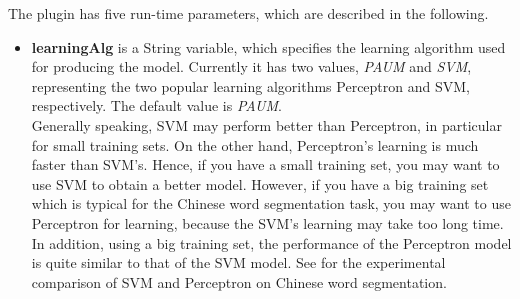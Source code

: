The plugin has five run-time parameters, which are described in the following.
\begin{itemize}
\item {\bf learningAlg} is a String variable, which specifies the learning
  algorithm used for producing the model. Currently it has two values, {\em
    PAUM} and {\em SVM}, representing the two popular learning algorithms
  Perceptron and SVM, respectively. The default value is {\em PAUM}.\\
  Generally speaking, SVM may perform better than Perceptron, in particular
  for small training sets. On the other hand, Perceptron's learning is much
  faster than SVM's. Hence, if you have a small training set, you may want to
  use SVM to obtain a better model. However, if you have a big training set
  which is typical for the Chinese word segmentation task, you may want to use
  Perceptron for learning, because the SVM's learning may take too long
  time. In addition, using a big training set, the performance of the
  Perceptron model is quite similar to that of the SVM model. See
  \cite{Yaoyong05b} for the experimental comparison of SVM and Perceptron on
  Chinese word segmentation.


\end{itemize}
